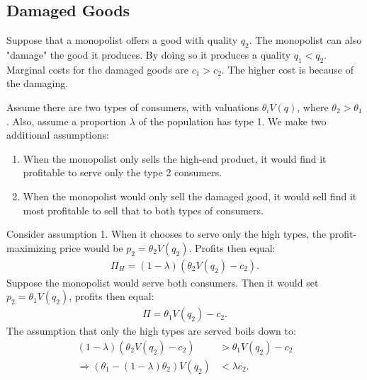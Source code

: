 \subsection{Damaged Goods}
Suppose that a monopolist offers a good with quality $q_2$. The monopolist can also "damage" the good it produces. By doing so it produces a quality
$q_1<q_2$. Marginal costs for the damaged goods are $c_1>c_2$. The higher cost is because of the damaging.

Assume there are two types of consumers, with valuations $\theta_iV(q)$, where $\theta_2>\theta_1$. Also, assume a proportion $\lambda$ of the
population has type 1. We make two additional assumptions:
\begin{enumerate}
	\item When the monopolist only sells the high-end product, it would find it profitable to
	      serve only the type 2 consumers.
	\item When the monopolist would only sell the damaged good, it would sell find it most
	      profitable to sell that to both types of consumers.
\end{enumerate}

Consider assumption 1. When it chooses to serve only the high types, the profit-maximizing price would be $p_2=\theta_2V(q_2)$. Profits then equal:
\begin{align}
	\Pi_H=(1-\lambda)(\theta_2V(q_2)-c_2).
\end{align}
Suppose the monopolist would serve both consumers. Then it would set $p_2=\theta_1V(q_2)$, profits then equal:
\begin{align}
	\Pi=\theta_1V(q_2)-c_2.
\end{align}
The assumption that only the high types are served boils down to:
\begin{align}
	(1-\lambda)(\theta_2V(q_2)-c_2)                     & >\theta_1V(q_2)-c_2 \\
	\Longrightarrow(\theta_1-(1-\lambda)\theta_2)V(q_2) & <\lambda c_2.
\end{align}

